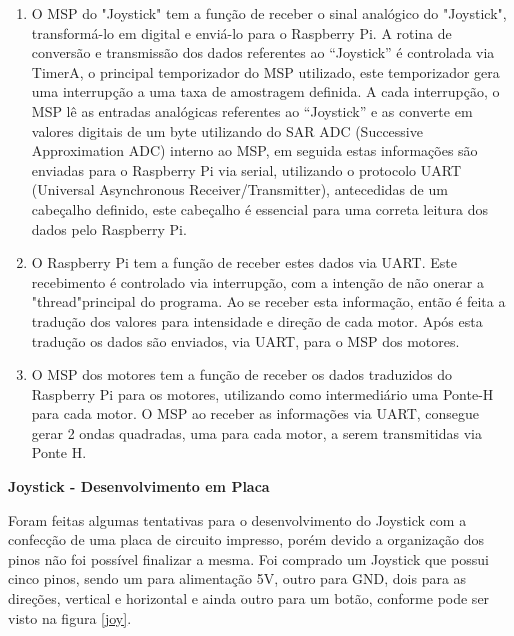 \begin{enumerate}
  \item O MSP do "Joystick" tem a função de receber o sinal analógico do "Joystick", transformá-lo em digital e enviá-lo para o Raspberry Pi. A rotina de conversão e transmissão dos dados referentes ao “Joystick” é controlada via TimerA, o principal temporizador do MSP utilizado, este temporizador gera uma interrupção a uma taxa de amostragem definida. A cada interrupção, o MSP lê as entradas analógicas referentes ao “Joystick” e as converte em valores digitais de um byte utilizando do SAR ADC (Successive Approximation ADC) interno ao MSP, em seguida estas informações são enviadas para o Raspberry Pi via serial, utilizando o protocolo UART (Universal Asynchronous Receiver/Transmitter), antecedidas de um cabeçalho definido, este cabeçalho é essencial para uma correta leitura dos dados pelo Raspberry Pi.
  \item O Raspberry Pi tem a função de  receber estes dados via UART. Este recebimento é controlado via interrupção, com a intenção de não onerar a "thread"principal do programa. Ao se receber esta informação, então é feita a tradução dos valores para intensidade e direção de cada motor. Após esta tradução os dados são enviados, via UART, para o MSP dos motores.
  \item O MSP dos motores tem a função de receber os dados traduzidos do Raspberry Pi para os motores, utilizando como intermediário uma Ponte-H para cada motor. O MSP ao receber as informações via UART, consegue gerar 2 ondas quadradas, uma para cada motor, a serem transmitidas via Ponte H.
\end{enumerate}

\textbf{Joystick - Desenvolvimento em Placa}

Foram feitas algumas tentativas para o desenvolvimento do Joystick com a confecção de uma placa de circuito impresso, porém devido a organização dos pinos não foi possível finalizar a mesma. Foi comprado um Joystick que possui cinco pinos, sendo um para alimentação 5V, outro para GND, dois para as direções, vertical e horizontal e ainda outro para um botão, conforme pode ser visto na figura \ref{joy}.

